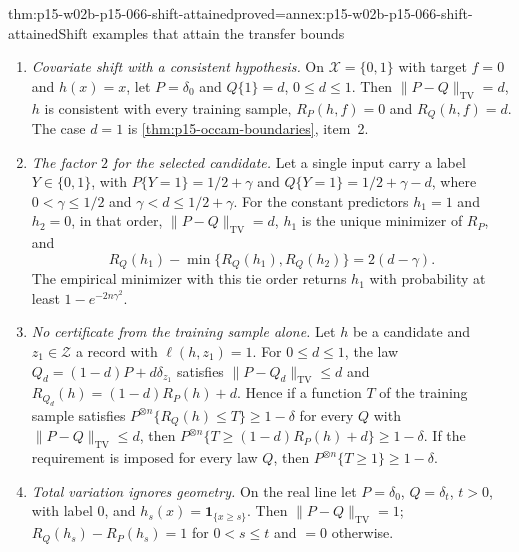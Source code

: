 \begin{hbtheorem}{thm:p15-w02b-p15-066-shift-attained}{proved=annex:p15-w02b-p15-066-shift-attained}{Shift examples that attain the transfer bounds}
\begin{enumerate}
\item \emph{Covariate shift with a consistent hypothesis.} On
      \(\mathcal X=\{0,1\}\) with target \(f=0\) and \(h(x)=x\), let
      \(P=\delta_0\) and \(Q\{1\}=d\), \(0\leq d\leq1\). Then
      \(\|P-Q\|_{\mathrm{TV}}=d\), \(h\) is consistent with every
      training sample, \(R_P(h,f)=0\) and \(R_Q(h,f)=d\). The case
      \(d=1\) is \cref{thm:p15-occam-boundaries}, item~2.
\item \emph{The factor \(2\) for the selected candidate.} Let a single
      input carry a label \(Y\in\{0,1\}\), with \(P\{Y=1\}=1/2+\gamma\)
      and \(Q\{Y=1\}=1/2+\gamma-d\), where \(0<\gamma\leq1/2\) and
      \(\gamma<d\leq1/2+\gamma\). For the constant predictors \(h_1=1\) and
      \(h_2=0\), in that order, \(\|P-Q\|_{\mathrm{TV}}=d\),
      \(h_1\) is the unique minimizer of \(R_P\), and
      \[
       R_Q(h_1)-\min\{R_Q(h_1),R_Q(h_2)\}=2(d-\gamma).
      \]
      The empirical minimizer with this tie order returns \(h_1\) with
      probability at least \(1-e^{-2n\gamma^2}\).
\item \emph{No certificate from the training sample alone.} Let \(h\)
      be a candidate and \(z_1\in\mathcal Z\) a record with
      \(\ell(h,z_1)=1\). For \(0\leq d\leq1\), the law
      \(Q_d=(1-d)P+d\delta_{z_1}\) satisfies
      \(\|P-Q_d\|_{\mathrm{TV}}\leq d\) and
      \(R_{Q_d}(h)=(1-d)R_P(h)+d\). Hence if a function \(T\) of the
      training sample satisfies \(P^{\otimes n}\{R_Q(h)\leq T\}\geq1-\delta\)
      for every \(Q\) with \(\|P-Q\|_{\mathrm{TV}}\leq d\), then
      \(P^{\otimes n}\{T\geq(1-d)R_P(h)+d\}\geq1-\delta\). If the
      requirement is imposed for every law \(Q\), then
      \(P^{\otimes n}\{T\geq1\}\geq1-\delta\).
\item \emph{Total variation ignores geometry.} On the real line let
      \(P=\delta_0\), \(Q=\delta_t\), \(t>0\), with label \(0\), and
      \(h_s(x)=\mathbf1_{\{x\geq s\}}\). Then
      \(\|P-Q\|_{\mathrm{TV}}=1\); \(R_Q(h_s)-R_P(h_s)=1\) for
      \(0<s\leq t\) and \(=0\) otherwise.
\end{enumerate}
\end{hbtheorem}

